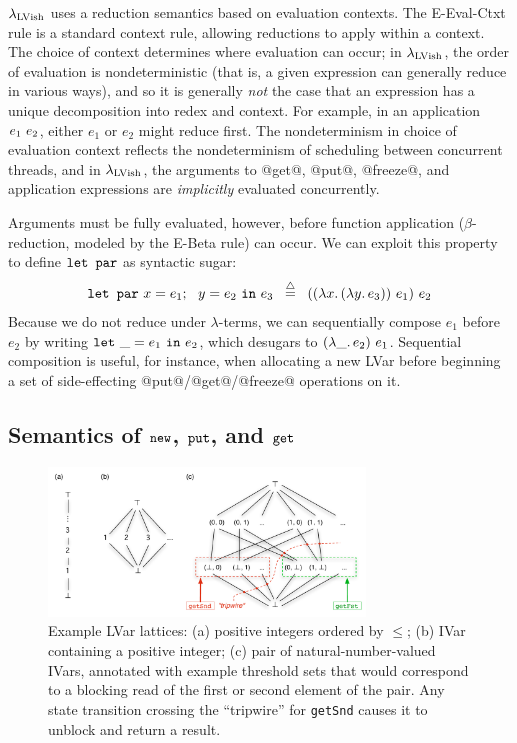 \documentclass{article}
\begin{document}
$\lambda_{\textrm{LVish}}$ uses a reduction semantics based on evaluation
contexts.  The {\sc E-Eval-Ctxt} rule is a standard context rule,
allowing reductions to apply within a context.  The choice of context
determines where evaluation can occur; in $\lambda_{\textrm{LVish}}$, the order of
evaluation is nondeterministic (that is, a given expression can
generally reduce in various ways), and so it is generally \emph{not}
the case that an expression has a unique decomposition into redex and
context.  For example, in an application $e_1~e_2$, either
$e_1$ or $e_2$ might reduce first.  The nondeterminism in choice of
evaluation context reflects the nondeterminism of scheduling between
concurrent threads, and in $\lambda_{\textrm{LVish}}$, the arguments to @get@,
@put@, @freeze@, and application expressions are \emph{implicitly}
evaluated concurrently.

Arguments must be fully evaluated, however, before function
application ($\beta$-reduction, modeled by the {\sc E-Beta} rule) can
occur.  We can exploit this property to define $\mbox{\texttt{\mbox{\texttt{let}}~\mbox{\texttt{par}}}}$ as syntactic
sugar:
\[
\mbox{\texttt{\mbox{\texttt{let}}~\mbox{\texttt{par}}}} ~x = e_1;~~y = e_2~\mbox{\texttt{in}}~e_3 \;\;\stackrel{\triangle}{=}\;\;
((\lambda x.\,(\lambda y.\,e_3))~e_1)~e_2
\]
Because we do not reduce under $\lambda$-terms, we can sequentially
compose $e_1$ before $e_2$ by writing $\mbox{\texttt{let}}~\_=e_1~\mbox{\texttt{in}}~e_2$, which
desugars to $(\lambda\_.\,e_2)~e_1$.  Sequential composition is
useful, for instance, when allocating a new LVar before beginning a
set of side-effecting @put@/@get@/@freeze@ operations on it.

\subsection{Semantics of $\mbox{\texttt{new}}$, $\mbox{\texttt{put}}$, and $\mbox{\texttt{get}}$}\label{subsection:newputget}

\begin{figure}
\centering
\includegraphics[width=0.75\textwidth]{figures/example-lvar-lattices.pdf} 
  \caption{Example LVar lattices: (a) positive integers ordered by
    $\leq$; (b) IVar containing a positive integer; (c) pair of
    natural-number-valued IVars, annotated with example threshold sets
    that would correspond to a blocking read of the first or second
    element of the pair.  Any state transition crossing the
    ``tripwire'' for \lstinline{getSnd} causes it to unblock and
    return a result.}

  \label{f:lattice-examples}
\end{figure}
\end{document}
